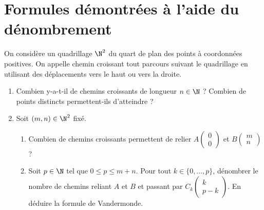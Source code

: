 \documentclass[a4paper, 11pt]{article}
\begin{document}
\section*{Formules d\'emontr\'ees \`a l'aide du d\'enombrement}
\vspace{0.2cm}

\begin{exercice}  \;
	On consid\`ere un quadrillage $\N^2$ du quart de plan des points \`a coordonn\'ees positives. On appelle chemin croissant tout parcours suivant le quadrillage en utilisant des d\'eplacements vers le haut ou vers la droite.
	\begin{enumerate}
		\item Combien y-a-t-il de chemins croissants de longueur $n\in\N$ ? Combien de points distincts permettent-ils d'atteindre ?
		\item Soit $(m,n)\in\N^{2}$ fix\'e.
		      \begin{enumerate}
			      \item Combien de chemins croissants permettent de relier $A\left(\begin{array}{c} 0\\0 \end{array}\right)$ et $B\left(\begin{array}{c} m\\n\end{array}\right)$ ?
			      \item Soit $p\in\N$ tel que $0\leq p\leq m+n$. Pour tout $k\in\lbrace 0,\dots,p\rbrace$, d\'enombrer le nombre de chemins reliant $A$ et $B$ et passant par $C_k\left(\begin{array}{c} k\\p-k \end{array}\right)$. En d\'eduire la formule de Vandermonde.
		      \end{enumerate}
	\end{enumerate}
\end{exercice}
\end{document}
